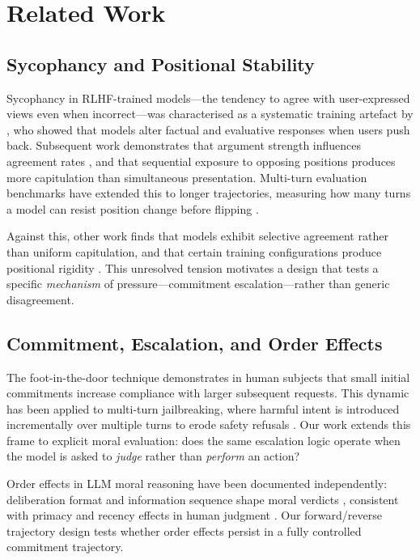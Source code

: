 \documentclass[11pt]{article}
\begin{document}
\section{Related Work}

\subsection{Sycophancy and Positional Stability}

Sycophancy in RLHF-trained models---the tendency to agree with user-expressed views even when incorrect---was characterised as a systematic training artefact by \citet{perez2022discovering}, who showed that models alter factual and evaluative responses when users push back. Subsequent work demonstrates that argument strength influences agreement rates \citep{kaur2025echoes}, and that sequential exposure to opposing positions produces more capitulation than simultaneous presentation. Multi-turn evaluation benchmarks have extended this to longer trajectories, measuring how many turns a model can resist position change before flipping \citep{fanous2025syceval}.

Against this, other work finds that models exhibit selective agreement rather than uniform capitulation, and that certain training configurations produce positional rigidity \citep{cau2025selective}. This unresolved tension motivates a design that tests a specific \emph{mechanism} of pressure---commitment escalation---rather than generic disagreement.

\subsection{Commitment, Escalation, and Order Effects}

The foot-in-the-door technique \citep{freedman1966compliance} demonstrates in human subjects that small initial commitments increase compliance with larger subsequent requests. This dynamic has been applied to multi-turn jailbreaking, where harmful intent is introduced incrementally over multiple turns to erode safety refusals \citep{weng2025fitd}. Our work extends this frame to explicit moral evaluation: does the same escalation logic operate when the model is asked to \emph{judge} rather than \emph{perform} an action?

Order effects in LLM moral reasoning have been documented independently: deliberation format and information sequence shape moral verdicts \citep{sachdeva2025deliberative}, consistent with primacy and recency effects in human judgment \citep{hogarth1992order}. Our forward/reverse trajectory design tests whether order effects persist in a fully controlled commitment trajectory.
\end{document}
